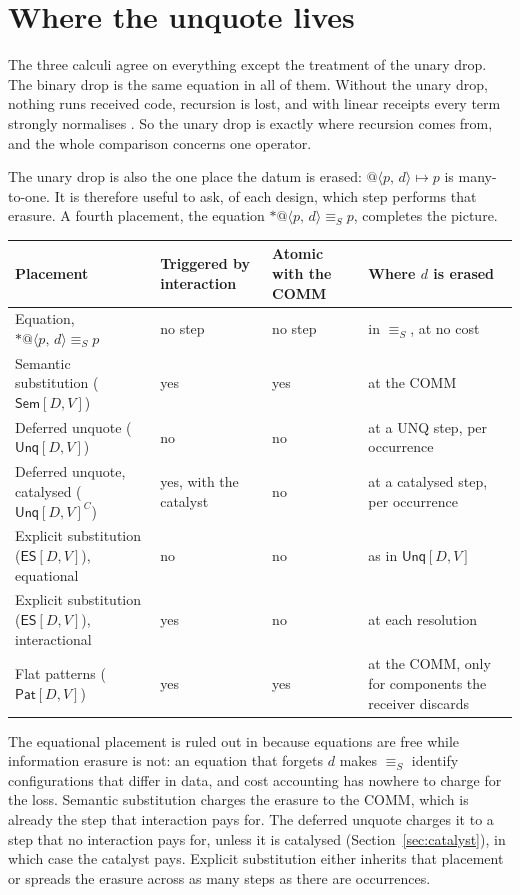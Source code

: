 \documentclass[11pt,a4paper]{article}
\makeatletter
\theoremstyle{plain}
\theoremstyle{definition}
\theoremstyle{remark}
\newcommand{\qn}[2]{@\langle #1,\,#2\rangle}
\newcommand{\drop}[1]{{*}#1}
\newcommand{\scong}{\equiv_{S}}
\newcommand{\Sem}{\textsf{Sem}[D,V]}
\newcommand{\Unq}{\textsf{Unq}[D,V]}
\newcommand{\ES}{\textsf{ES}[D,V]}
\newcommand{\Pat}{\textsf{Pat}[D,V]}
\makeatother
\begin{document}
\section{Where the unquote lives}\label{sec:where}

The three calculi agree on everything except the treatment of the unary drop.
The binary drop is the same equation in all of them. Without the unary drop,
nothing runs received code, recursion is lost, and with linear receipts every
term strongly normalises \cite{UE}. So the unary drop is exactly where
recursion comes from, and the whole comparison concerns one operator.

The unary drop is also the one place the datum is erased:
$\qn{p}{d}\mapsto p$ is many-to-one. It is therefore useful to ask, of each
design, which step performs that erasure. A fourth placement, the equation
$\drop{\qn{p}{d}}\scong p$, completes the picture.

\begin{center}
\begin{tabular}{@{}L{0.30\textwidth}L{0.16\textwidth}L{0.16\textwidth}L{0.28\textwidth}@{}}
\toprule
\textbf{Placement} & \textbf{Triggered by interaction} & \textbf{Atomic with the COMM} & \textbf{Where $d$ is erased}\\
\midrule
Equation, $\drop{\qn{p}{d}}\scong p$ & no step & no step & in $\scong$, at no cost\\
Semantic substitution ($\Sem$) & yes & yes & at the COMM\\
Deferred unquote ($\Unq$) & no & no & at a UNQ step, per occurrence\\
Deferred unquote, catalysed ($\Unq^{C}$) & yes, with the catalyst & no & at a catalysed step, per occurrence\\
Explicit substitution ($\ES$), equational & no & no & as in $\Unq$\\
Explicit substitution ($\ES$), interactional & yes & no & at each resolution\\
Flat patterns ($\Pat$) & yes & yes & at the COMM, only for components the receiver discards\\
\bottomrule
\end{tabular}
\end{center}

The equational placement is ruled out in \cite{UE} because equations are free
while information erasure is not: an equation that forgets $d$ makes $\scong$
identify configurations that differ in data, and cost accounting has nowhere to
charge for the loss. Semantic substitution charges the erasure to the COMM,
which is already the step that interaction pays for. The deferred unquote
charges it to a step that no interaction pays for, unless it is catalysed
(Section~\ref{sec:catalyst}), in which case the catalyst pays. Explicit
substitution either inherits that placement or spreads the erasure across as
many steps as there are occurrences.
\end{document}
